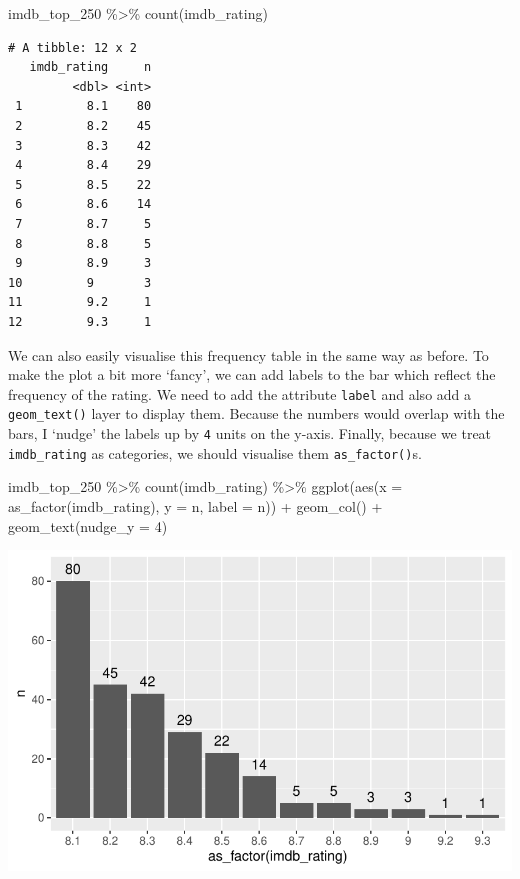 \documentclass[
  letterpaper,
]{krantz}
\makeatletter
\newenvironment{Shaded}{\begin{snugshade}}{\end{snugshade}}
\newcommand{\AttributeTok}[1]{\textcolor[rgb]{0.40,0.45,0.13}{#1}}
\newcommand{\DecValTok}[1]{\textcolor[rgb]{0.68,0.00,0.00}{#1}}
\newcommand{\FunctionTok}[1]{\textcolor[rgb]{0.28,0.35,0.67}{#1}}
\newcommand{\NormalTok}[1]{\textcolor[rgb]{0.00,0.23,0.31}{#1}}
\newcommand{\SpecialCharTok}[1]{\textcolor[rgb]{0.37,0.37,0.37}{#1}}
\newenvironment{kframe}{%
\medskip{}
\setlength{\fboxsep}{.8em}
 \def\at@end@of@kframe{}%
 \ifinner\ifhmode%
  \def\at@end@of@kframe{\end{minipage}}%
  \begin{minipage}{\columnwidth}%
 \fi\fi%
 \def\FrameCommand##1{\hskip\@totalleftmargin \hskip-\fboxsep
 \colorbox{shadecolor}{##1}\hskip-\fboxsep
     \hskip-\linewidth \hskip-\@totalleftmargin \hskip\columnwidth}%
 \MakeFramed {\advance\hsize-\width
   \@totalleftmargin\z@ \linewidth\hsize
   \@setminipage}}%
 {\par\unskip\endMakeFramed%
 \at@end@of@kframe}
\renewenvironment{Shaded}{\begin{kframe}}{\end{kframe}}
\makeatother
\begin{document}
\begin{Shaded}
\begin{Highlighting}[]
\NormalTok{imdb\_top\_250 }\SpecialCharTok{\%\textgreater{}\%} \FunctionTok{count}\NormalTok{(imdb\_rating)}
\end{Highlighting}
\end{Shaded}

\begin{verbatim}
# A tibble: 12 x 2
   imdb_rating     n
         <dbl> <int>
 1         8.1    80
 2         8.2    45
 3         8.3    42
 4         8.4    29
 5         8.5    22
 6         8.6    14
 7         8.7     5
 8         8.8     5
 9         8.9     3
10         9       3
11         9.2     1
12         9.3     1
\end{verbatim}

We can also easily visualise this frequency table in the same way as
before. To make the plot a bit more `fancy', we can add labels to the
bar which reflect the frequency of the rating. We need to add the
attribute \texttt{label} and also add a \texttt{geom\_text()} layer to
display them. Because the numbers would overlap with the bars, I `nudge'
the labels up by \texttt{4} units on the y-axis. Finally, because we
treat \texttt{imdb\_rating} as categories, we should visualise them
\texttt{as\_factor()}s.

\begin{Shaded}
\begin{Highlighting}[]
\NormalTok{imdb\_top\_250 }\SpecialCharTok{\%\textgreater{}\%}
  \FunctionTok{count}\NormalTok{(imdb\_rating) }\SpecialCharTok{\%\textgreater{}\%}
  \FunctionTok{ggplot}\NormalTok{(}\FunctionTok{aes}\NormalTok{(}\AttributeTok{x =} \FunctionTok{as\_factor}\NormalTok{(imdb\_rating),}
             \AttributeTok{y =}\NormalTok{ n,}
             \AttributeTok{label =}\NormalTok{ n)) }\SpecialCharTok{+}
  \FunctionTok{geom\_col}\NormalTok{() }\SpecialCharTok{+}
  \FunctionTok{geom\_text}\NormalTok{(}\AttributeTok{nudge\_y =} \DecValTok{4}\NormalTok{)}
\end{Highlighting}
\end{Shaded}

\includegraphics{08_descriptive_statistics_files/figure-pdf/mode-visualised-as-freq-table-1.pdf}
\end{document}
